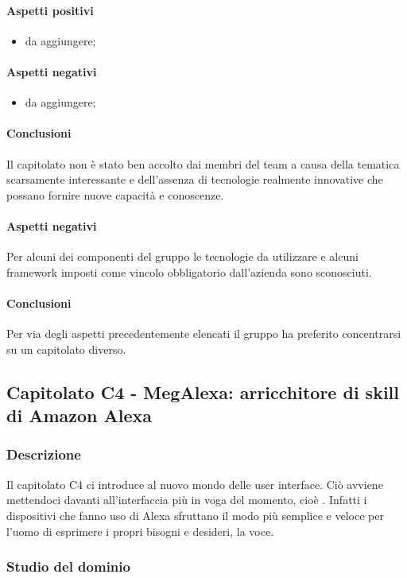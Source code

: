 	\paragraph{Aspetti positivi}
	\begin{itemize}
		\item {da aggiungere;}
	\end{itemize} 
	\paragraph{Aspetti negativi} 
	\begin{itemize}
	\item {da aggiungere;}
	\end{itemize} 
	\paragraph{Conclusioni} \Spazio
	Il capitolato non è stato ben accolto dai membri del team a causa della tematica scarsamente interessante e dell'assenza di tecnologie realmente innovative che possano fornire nuove capacità e conoscenze.
	\paragraph{Aspetti negativi} 
	Per alcuni dei componenti del gruppo le tecnologie da utilizzare e alcuni framework imposti come vincolo obbligatorio dall'azienda sono sconosciuti.
	\paragraph{Conclusioni}
	Per via degli aspetti precedentemente elencati il gruppo ha preferito concentrarsi su un capitolato diverso.
	
	
	\subsection{Capitolato C4 - MegAlexa: arricchitore di skill di Amazon Alexa}
	\subsubsection{Descrizione}	
		Il capitolato C4 ci introduce al nuovo mondo delle user interface. Ciò avviene mettendoci davanti all’interfaccia più in voga del momento, cioè . Infatti i dispositivi che fanno uso di Alexa sfruttano il modo più semplice e veloce per l’uomo di esprimere i propri bisogni e desideri, la voce. 
	\subsubsection{Studio del dominio}
	
